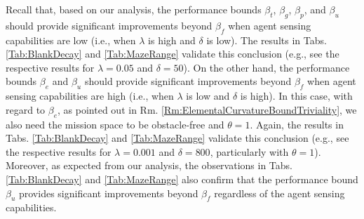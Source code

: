 \documentclass[letterpaper, 10 pt, conference]{ieeeconf}
\begin{document}
Recall that, based on our analysis, the performance bounds $\beta_t$, $\beta_g$, $\beta_p$, and $\beta_u$ should provide significant improvements beyond $\beta_f$ when agent sensing capabilities are low (i.e., when $\lambda$ is high and $\delta$ is low). The results in Tabs. \ref{Tab:BlankDecay} and \ref{Tab:MazeRange} validate this conclusion (e.g., see the respective results for $\lambda=0.05$ and $\delta=50$). 
On the other hand, the performance bounds $\beta_e$ and $\beta_u$ should provide significant improvements beyond $\beta_f$ when agent sensing capabilities are high (i.e., when $\lambda$ is low and $\delta$ is high). In this case, with regard to $\beta_e$, as pointed out in Rm. \ref{Rm:ElementalCurvatureBoundTriviality}, we also need the mission space to be obstacle-free and $\theta=1$. Again, the results in Tabs. \ref{Tab:BlankDecay} and \ref{Tab:MazeRange} validate this conclusion (e.g., see the respective results for $\lambda=0.001$ and $\delta=800$, particularly with $\theta = 1$). Moreover, as expected from our analysis, the observations in Tabs. \ref{Tab:BlankDecay} and \ref{Tab:MazeRange} also confirm that the performance bound $\beta_u$ provides significant improvements beyond $\beta_f$ regardless of the agent sensing capabilities. 

\end{document}
